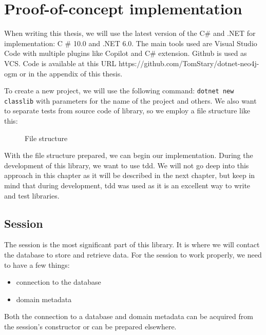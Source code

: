 \chapter {Proof-of-concept implementation}


When writing this thesis, we will use the latest version of the C\# and .NET for implementation: C \# 10.0 and .NET 6.0.
The main tools used are Visual Studio Code with multiple plugins like Copilot and C\# extension. Github is used as VCS. Code is available at this URL https://github.com/TomStary/dotnet-neo4j-ogm or in the appendix of this thesis.

To create a new project, we will use the following command: \texttt{dotnet new classlib} with parameters for the name of the project and others.
We also want to separate tests from source code of library, so we employ a file structure like this:

\begin{figure}[H]
    \caption{File structure}
\end{figure}

With the file structure prepared, we can begin our implementation. During the development of this
library, we want to use \acrfull{tdd}. We will not go deep into this approach in this chapter
as it will be described in the next chapter, but keep in mind that during development, \acrshort{tdd} was used as it is an excellent way to write and test libraries.

\section {Session}

The session is the most significant part of this library. It is where we will contact the database to store and retrieve data.
For the session to work properly, we need to have a few things:

\begin{itemize}
    \item connection to the database
    \item domain metadata
\end{itemize}

Both the connection to a database and domain metadata can be acquired from the session's constructor or can be prepared elsewhere.



